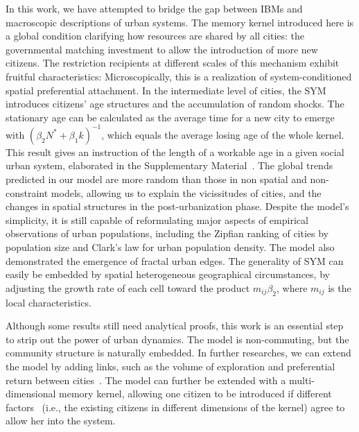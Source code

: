 In this work, we have attempted to bridge the gap between IBMs and macroscopic descriptions of urban systems. The memory kernel introduced here is a global condition clarifying how resources are shared by all cities: the governmental matching investment to allow the introduction of more new citizens. The restriction recipients at different scales of this mechanism exhibit fruitful characteristics: Microscopically, this is a realization of system-conditioned spatial preferential attachment. In the intermediate level of cities, the SYM introduces citizens' age structures and the accumulation of random shocks. The stationary age can be calculated as the average time for a new city to emerge with $(\beta_2 N^* + \beta_1 k)^{-1}$, which equals the average losing age of the whole kernel. This result gives an instruction of the length of a workable age in a given social urban system, elaborated in the Supplementary Material~\cite{SuppInfo}. The global trends predicted in our model are more random than those in non spatial and non-constraint models, allowing us to explain the vicissitudes of cities, and the changes in spatial structures in the post-urbanization phase. Despite the model's simplicity, it is still capable of reformulating major aspects of empirical observations of urban populations, including the Zipfian ranking of cities by population size and Clark's law for urban population density. The model also demonstrated the emergence of fractal urban edges. The generality of SYM can easily be embedded by spatial heterogeneous geographical circumstances, by adjusting the growth rate of each cell toward the product $m_{ij}\beta_2$, where $m_{ij}$ is the local characteristics.

Although some results still need analytical proofs, this work is an essential step to strip out the power of urban dynamics. The model is non-commuting, but the community structure is naturally embedded. In further researches, we can extend the model by adding links, such as the volume of exploration and preferential return between cities~\cite{WANG2019121921}. The model can further be extended with a multi-dimensional memory kernel, allowing one citizen to be introduced if different factors~\cite{tokita2020social} (i.e., the existing citizens in different dimensions of the kernel) agree to allow her into the system.